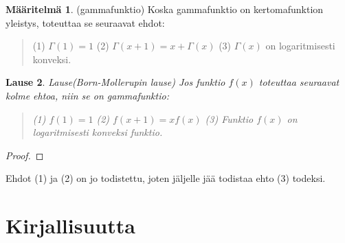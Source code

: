 \documentclass[12pt]{article}
\theoremstyle{definition}
\newtheorem{maar}{Määritelmä}
\theoremstyle{plain}
\newtheorem{lause}[maar]{Lause}
\begin{document}
\begin{maar}
(gammafunktio)
Koska gammafunktio on kertomafunktion yleistys, toteuttaa se seuraavat ehdot:
\begin{quote}
    (1) $\Gamma(1)=1$ \newline
    (2) $\Gamma(x+1)=x+\Gamma(x)$ \newline
    (3) $\Gamma(x)$ on logaritmisesti konveksi.
\end{quote}
\end{maar}

\begin{lause}
Lause(Born-Mollerupin lause)
\newline
Jos funktio $f(x)$ toteuttaa seuraavat kolme ehtoa, niin se on gammafunktio:
\begin{quote}
(1) $f(1)=1$ \newline
(2) $f(x+1)=xf(x)$ \newline
(3) Funktio $f(x)$ on logaritmisesti konveksi funktio.
\end{quote}
\end{lause}

\begin{proof}

\end{proof}
\newline
Ehdot (1) ja (2) on jo todistettu, joten jäljelle jää todistaa ehto (3) todeksi. 

\newpage
\section{Kirjallisuutta}
\onehalfspacing
[1] 
\newline
[2]
\newline
[3]
\newline
[4]
\end{document}
